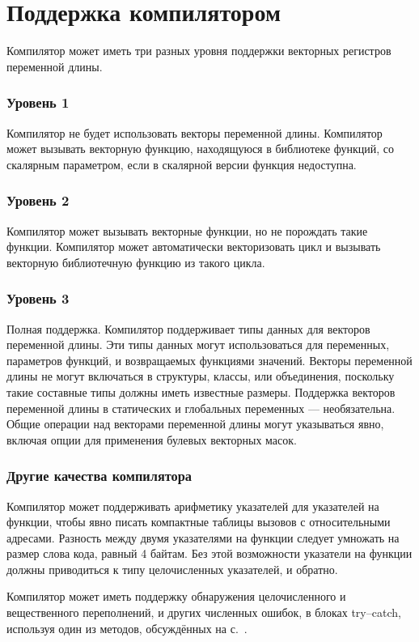 \documentclass[forwardcom.tex]{subfiles}
\begin{document}
\section{Поддержка компилятором} \label{compilerSupport}
Компилятор может иметь три разных уровня поддержки векторных регистров переменной длины. 

\subsubsection{Уровень 1}
Компилятор не будет использовать векторы переменной длины. Компилятор может вызывать векторную функцию, находящуюся в библиотеке функций, со скалярным параметром, если в скалярной версии функция недоступна.

\subsubsection{Уровень 2}
Компилятор может вызывать векторные функции, но не порождать такие функции. Компилятор может автоматически векторизовать цикл и вызывать векторную библиотечную функцию из такого цикла. 

\subsubsection{Уровень 3}
Полная поддержка. Компилятор поддерживает типы данных для векторов переменной длины. Эти типы данных могут использоваться для переменных, параметров функций, и возвращаемых функциями значений. Векторы переменной длины не могут включаться в структуры, классы, или объединения, поскольку такие составные типы должны иметь известные размеры. Поддержка векторов переменной длины в статических и глобальных переменных --- необязательна. Общие операции над векторами переменной длины могут указываться явно, включая опции для применения булевых векторных масок.

\subsubsection{Другие качества компилятора}
Компилятор может поддерживать арифметику указателей для указателей на функции, чтобы явно писать компактные таблицы вызовов с относительными адресами. Разность между двумя указателями на функции следует умножать на размер слова кода, равный 4 байтам. Без этой возможности указатели на функции должны приводиться к типу целочисленных указателей, и обратно.

Компилятор может иметь поддержку обнаружения целочисленного и вещественного переполнений, и других численных ошибок, в блоках try--catch, используя один из методов, обсуждённых на с.~\pageref{integerOverflowDetection}.
\end{document}
